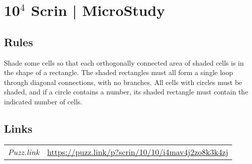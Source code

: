 \section[10$^4$ Scrin | MicroStudy {[\emph{Scrin}]}]{10$^4$ Scrin | {\normalfont MicroStudy}}
\label{sec:29-10-4-scrin-microstudy}

\subsection*{Rules}
\begin{markdown}
Shade some cells so that each orthogonally connected area of shaded cells is in the shape of a rectangle. The shaded rectangles must all form a single loop through diagonal connections, with no branches. All cells with circles must be shaded, and if a circle contains a number, its shaded rectangle must contain the indicated number of cells.
\end{markdown}
\subsection*{Links}
\begin{tabularx}{\textwidth}{l X}
\emph{Puzz.link} & \url{https://puzz.link/p?scrin/10/10/i4mav4j2zo8k3k4zj} \\
\end{tabularx}
\pagebreak

